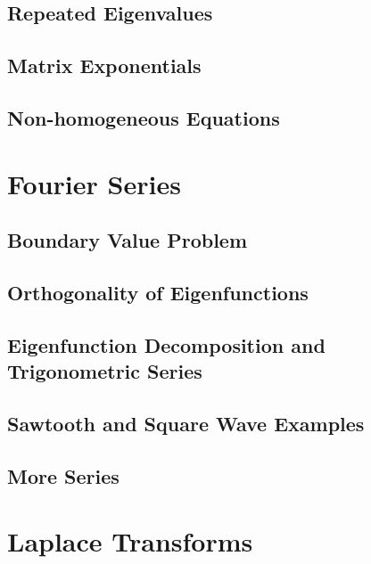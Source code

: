\documentclass[
  letterpaper,
]{report}
\begin{document}
\section{Repeated Eigenvalues}\label{repeated-eigenvalues}

\section{Matrix Exponentials}\label{matrix-exponentials}

\section{Non-homogeneous Equations}\label{non-homogeneous-equations}


\chapter{Fourier Series}\label{fourier-series}

\section{Boundary Value Problem}\label{boundary-value-problem}

\section{Orthogonality of
Eigenfunctions}\label{orthogonality-of-eigenfunctions}

\section{Eigenfunction Decomposition and Trigonometric
Series}\label{eigenfunction-decomposition-and-trigonometric-series}

\section{Sawtooth and Square Wave
Examples}\label{sawtooth-and-square-wave-examples}

\section{More Series}\label{more-series}


\chapter{Laplace Transforms}\label{laplace-transforms}
\end{document}
